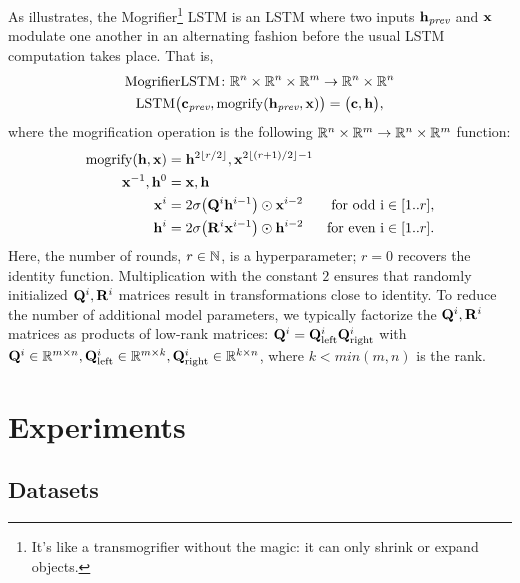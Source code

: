 As  illustrates, the Mogrifier\footnote{It's like
a transmogrifier\footnotemark{} without the magic: it can only shrink
or expand objects.}
LSTM is an LSTM where two inputs $\mathbf{h}_{\textit{prev}}$ and $\mathbf{x}$ modulate
one another in an alternating fashion before the usual LSTM
computation takes place.
That is,
\begin{gather*}
\mathrm{MogrifierLSTM} \colon \mathbb{R}^n\times\mathbb{R}^n \times \mathbb{R}^m \to \mathbb{R}^n \times \mathbb{R}^n \\
\operatorname*{LSTM}\bigl(\mathbf{c}_{\textit{prev}}, \operatorname*{mogrify}(\mathbf{h}_{\textit{prev}}, \mathbf{x})\bigr) = \bigl(\mathbf{c}, \mathbf{h}\bigr),
\end{gather*}
where the mogrification operation is the following $\mathbb{R}^n\times\mathbb{R}^m \to \mathbb{R}^n \times \mathbb{R}^m$ function:
{\def\groundprop{1.5}
\begin{equation}
\label{eq:mogrify}
\begin{aligned}
  \operatorname*{mogrify}(\mathbf{h},\mathbf{x}) &= \mathbf{h}^{2\lfloor r/2\rfloor}, \mathbf{x}^{2\lfloor(r+1)/2\rfloor-1}\\
  \mathbf{x}^{-1}, \mathbf{h}^0 &= \mathbf{x}, \mathbf{h}\\
  \mathbf{x}^i &= 2\sigma\bigl(\mathbf{Q}^{i}\mathbf{h}^{i-1}\bigr) \odot \mathbf{x}^{i-2} &
  \text{for odd i} \in [1..r],\\
  \mathbf{h}^i &= 2\sigma\bigl(\mathbf{R}^{i}\mathbf{x}^{i-1}\bigr) \odot \mathbf{h}^{i-2}
  & \text{for even i} \in [1..r].
\end{aligned}
\end{equation}}%
Here, the number of rounds, $r \in \mathbb{N}$, is a hyperparameter;
$r=0$ recovers the identity function.
%
Multiplication with the constant $2$ ensures that randomly initialized
$\mathbf{Q}^{i}, \mathbf{R}^{i}$ matrices result in transformations close to
identity.
%
To reduce the number of additional model parameters, we typically
factorize the $\mathbf{Q}^{i}, \mathbf{R}^{i}$ matrices as products of low-rank
matrices: $\mathbf{Q}^i = \mathbf{Q}^i_{\textrm{left}} \mathbf{Q}^i_{\textrm{right}}$ with
$\mathbf{Q}^i \in \mathbb{R}^{m \times n}, \mathbf{Q}^i_{\textrm{left}} \in
\mathbb{R}^{m \times k}, \mathbf{Q}^i_{\textrm{right}} \in \mathbb{R}^{k
  \times n}$, where $k<min(m,n)$ is the rank.\\[-\groundskip]

\section{Experiments}

\subsection{Datasets}

